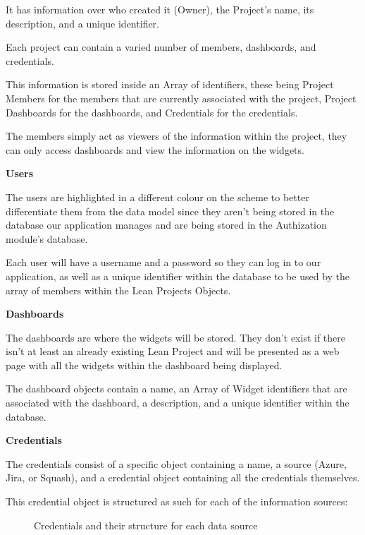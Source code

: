 \documentclass[a4paper,twoside,10pt]{report}
\begin{document}
It has information over who created it (Owner), the Project's name, its description, and a unique identifier.

Each project can contain a varied number of members, dashboards, and credentials. 

This information is stored inside an Array of identifiers, these being Project Members for the members that are currently associated with the project, Project Dashboards for the dashboards, and Credentials for the credentials.

The members simply act as viewers of the information within the project, they can only access dashboards and view the information on the widgets.


\textbf{Users}

The users are highlighted in a different colour  on the scheme to better differentiate them from the data model since they aren't being stored in the database our application manages and are being stored in the Authization module's database.

Each user will have a username and a password so they can log in to our application, as well as a unique identifier within the database to be used by the array of members within the Lean Projects Objects.


\textbf{Dashboards}

The dashboards are where the widgets will be stored. They don't exist if there isn't at least an already existing Lean Project and will be presented as a web page with all the widgets within the dashboard being displayed.

The dashboard objects contain a name, an Array of Widget identifiers that are associated with the dashboard, a description, and a unique identifier within the database.


\textbf{Credentials}

The credentials consist of a specific object containing a name, a source (Azure, Jira, or Squash), and a credential object containing all the credentials themselves.

This credential object is structured as such for each of the information sources:

\begin{figure}[h!]
\center
\caption{Credentials and their structure for each data source}
\end{figure}
\end{document}
